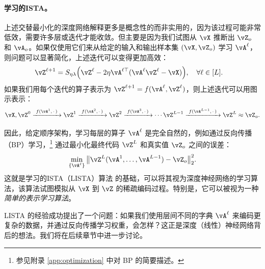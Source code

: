 \documentclass[../../book-main_zh.tex]{subfiles}
\begin{document}
\paragraph{学习的ISTA。} 上述交替最小化的深度网络解释更多是概念性的而非实用的，因为该过程可能非常低效，需要许多层或迭代才能收敛。但主要是因为我们试图从 $\vX$ 推断出 $\vZ_o$ 和 $\vA_o$。如果仅使用它们来从给定的输入和输出样本集 $(\vX, \vZ_o)$ 学习 $\vA^\ell$，则问题可以显著简化，上述迭代可以变得更加高效：
\begin{align}
    & \vZ^{\ell + 1} = S_{\eta\lambda}\rp{\vZ^{\ell} - 2\eta\vA^{\ell\top}(\vA^\ell\vZ^{\ell} - \vX)}, \quad \forall \ell \in [L].
\end{align}
如果我们用每个迭代的算子表示为 $\vZ^{\ell + 1} = f(\vA^\ell, \vZ^\ell)$，则上述迭代可以用图示表示：
\begin{equation*}
\vX, \vZ^0 \xrightarrow{\hspace{1mm} f(\vA^1,\,\cdot\,) \hspace{1mm}}  \vZ^1 \xrightarrow{\hspace{1mm} f(\vA^2,\,\cdot\,) \hspace{1mm}}  \vZ^2  \xrightarrow{\hspace{1mm} f(\vA^3,\,\cdot\,) \hspace{1mm}} \cdots \vZ^{L-1}  \xrightarrow{\hspace{1mm} f(\vA^{L-1},\,\cdot\,) \hspace{1mm}} \vZ^L \approx \vZ_o.  
\label{eqn:deep-sparse-encoding}
\end{equation*}

因此，给定顺序架构，学习每层的算子 \(\vA^\ell\) 是完全自然的，例如通过反向传播（BP）学习，\footnote{参见附录 \ref{app:optimization} 中对 BP 的简要描述。} 通过最小化最终代码 $\vZ^L$ 和真实值 $\vZ_o$ 之间的误差：
\begin{equation}
    \min_{\{\vA^\ell\}} \big\|\vZ^L(\vA^1, \ldots, \vA^{L-1}) - \vZ_o\big\|_2^2.
\end{equation}
这就是学习的ISTA（LISTA）算法 \cite{gregor2010learning} 的基础，可以将其视为深度神经网络的学习算法，该算法试图模拟从 $\vX$ 到 $\vZ$ 的稀疏编码过程。特别是，它可以被视为一种 \textit{简单的表示学习算法}。

LISTA 的经验成功提出了一个问题：如果我们使用层间不同的字典 \(\vA^\ell\) 来编码更复杂的数据，并通过反向传播学习权重，会怎样？这正是深度（线性）神经网络背后的想法。我们将在后续章节中进一步讨论。

\end{document}
